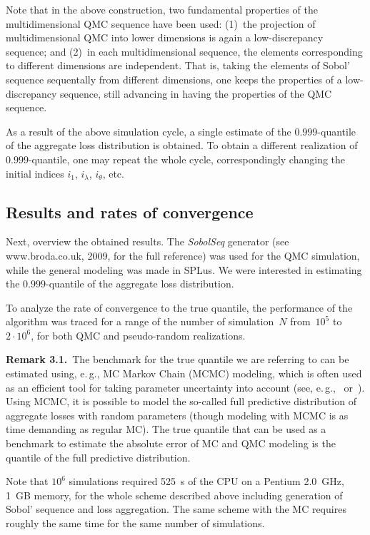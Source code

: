\begin{multicols}{2}
Note that in the above construction, two fundamental
properties of the multidimensional QMC sequence have been used:
(1)~the projection
of multidimensional QMC into lower dimensions is again a
low-discrepancy sequence; and (2)~in each multidimensional sequence, the
elements corresponding to different dimensions are independent. That
is, taking the elements of Sobol' sequence sequentally from
different dimensions, one keeps the properties of a low-discrepancy
sequence, still advancing in having the properties of the QMC
sequence.

As a result of the above simulation cycle, a single estimate of
the $0.999$-quantile of the aggregate loss distribution is
obtained. To obtain a different realization of $0.999$-quantile,
one may repeat the whole cycle, correspondingly changing the
initial indices $i_1$, $i_\lambda$, $i_\theta$, etc.

\subsection{Results and rates of convergence}

\noindent
Next, overview the obtained results. The {\it SobolSeq} generator
(see {\sf www.broda.co.uk}, 2009, for the full reference) was used for the
QMC simulation, while the general modeling was made in SPLus. We
were interested in estimating the $0.999$-quantile of the aggregate
loss distribution.

To analyze the rate of convergence to the true quantile,
the performance of the algorithm was traced for a range of the number of
simulation~$N$ from~$10^5$ to $2\cdot10^6$, for both QMC and
pseudo-random realizations.

\medskip

\noindent
\textbf{Remark 3.1.}\
The benchmark for the true quantile we are referring
to can be estimated using, e.\,g., MC Markov Chain (MCMC)
modeling, which is often used as an efficient tool for taking
parameter uncertainty into account (see, e.\,g.,~\cite{Shev4} or~\cite{Shev5}).
Using MCMC, it is possible to model the so-called full
predictive distribution of aggregate losses with random parameters
(though modeling with MCMC is as time demanding as regular MC). The
true quantile that can be used as a benchmark to estimate the
absolute error of MC and QMC modeling is the quantile of the full
predictive distribution.

\medskip


Note that $10^6$ simulations required 525~s of the CPU on
a Pentium 2.0~GHz, 1~GB memory, for the whole scheme described
above including generation of Sobol' sequence and loss aggregation.
The same scheme with the MC requires roughly the same time
for the same number of simulations.


\end{multicols}
